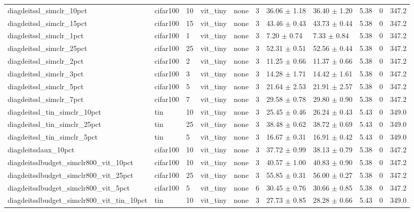 \begin{tabular}{lllllllllll}
diagdeitssl_simclr_10pct & cifar100 & 10 & vit_tiny & none & 3 & 36.06 $\pm$ 1.18 & 36.40 $\pm$ 1.20 & 5.38 & 0 & 347.2 \\
diagdeitssl_simclr_15pct & cifar100 & 15 & vit_tiny & none & 3 & 43.46 $\pm$ 0.43 & 43.73 $\pm$ 0.44 & 5.38 & 0 & 347.2 \\
diagdeitssl_simclr_1pct & cifar100 & 1 & vit_tiny & none & 3 & 7.20 $\pm$ 0.74 & 7.33 $\pm$ 0.84 & 5.38 & 0 & 347.2 \\
diagdeitssl_simclr_25pct & cifar100 & 25 & vit_tiny & none & 3 & 52.31 $\pm$ 0.51 & 52.56 $\pm$ 0.44 & 5.38 & 0 & 347.2 \\
diagdeitssl_simclr_2pct & cifar100 & 2 & vit_tiny & none & 3 & 11.25 $\pm$ 0.66 & 11.37 $\pm$ 0.66 & 5.38 & 0 & 347.2 \\
diagdeitssl_simclr_3pct & cifar100 & 3 & vit_tiny & none & 3 & 14.28 $\pm$ 1.71 & 14.42 $\pm$ 1.61 & 5.38 & 0 & 347.2 \\
diagdeitssl_simclr_5pct & cifar100 & 5 & vit_tiny & none & 3 & 21.64 $\pm$ 2.53 & 21.91 $\pm$ 2.57 & 5.38 & 0 & 347.2 \\
diagdeitssl_simclr_7pct & cifar100 & 7 & vit_tiny & none & 3 & 29.58 $\pm$ 0.78 & 29.80 $\pm$ 0.90 & 5.38 & 0 & 347.2 \\
diagdeitssl_tin_simclr_10pct & tin & 10 & vit_tiny & none & 3 & 25.45 $\pm$ 0.46 & 26.24 $\pm$ 0.43 & 5.43 & 0 & 349.0 \\
diagdeitssl_tin_simclr_25pct & tin & 25 & vit_tiny & none & 3 & 38.48 $\pm$ 0.62 & 38.72 $\pm$ 0.69 & 5.43 & 0 & 349.0 \\
diagdeitssl_tin_simclr_5pct & tin & 5 & vit_tiny & none & 3 & 16.67 $\pm$ 0.31 & 16.91 $\pm$ 0.42 & 5.43 & 0 & 349.0 \\
diagdeitsslaux_10pct & cifar100 & 10 & vit_tiny & none & 3 & 37.72 $\pm$ 0.99 & 38.13 $\pm$ 0.79 & 5.38 & 0 & 347.2 \\
diagdeitsslbudget_simclr800_vit_10pct & cifar100 & 10 & vit_tiny & none & 3 & 40.57 $\pm$ 1.00 & 40.83 $\pm$ 0.90 & 5.38 & 0 & 347.2 \\
diagdeitsslbudget_simclr800_vit_25pct & cifar100 & 25 & vit_tiny & none & 3 & 55.85 $\pm$ 0.31 & 56.00 $\pm$ 0.27 & 5.38 & 0 & 347.2 \\
diagdeitsslbudget_simclr800_vit_5pct & cifar100 & 5 & vit_tiny & none & 6 & 30.45 $\pm$ 0.76 & 30.66 $\pm$ 0.85 & 5.38 & 0 & 347.2 \\
diagdeitsslbudget_simclr800_vit_tin_10pct & tin & 10 & vit_tiny & none & 3 & 27.73 $\pm$ 0.85 & 28.28 $\pm$ 0.66 & 5.43 & 0 & 349.0 \\

\end{tabular}
